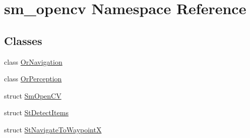 \hypertarget{namespacesm__opencv}{}\section{sm\+\_\+opencv Namespace Reference}
\label{namespacesm__opencv}
\subsection*{Classes}
\begin{DoxyCompactItemize}
\item 
class \hyperlink{classsm__opencv_1_1OrNavigation}{Or\+Navigation}
\item 
class \hyperlink{classsm__opencv_1_1OrPerception}{Or\+Perception}
\item 
struct \hyperlink{structsm__opencv_1_1SmOpenCV}{Sm\+Open\+CV}
\item 
struct \hyperlink{structsm__opencv_1_1StDetectItems}{St\+Detect\+Items}
\item 
struct \hyperlink{structsm__opencv_1_1StNavigateToWaypointX}{St\+Navigate\+To\+WaypointX}
\end{DoxyCompactItemize}
